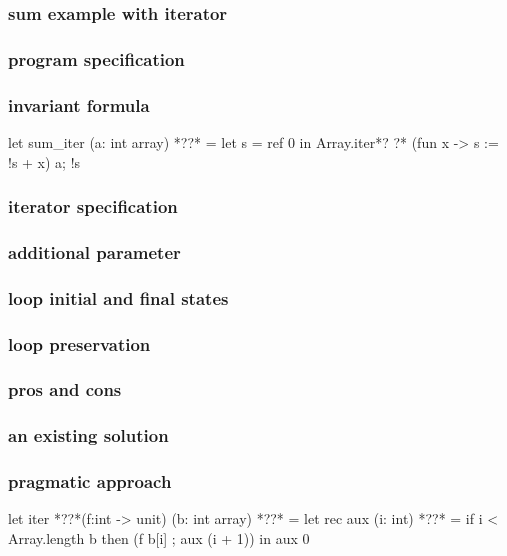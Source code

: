 \begin{frame}[fragile]
\frametitle<1>{sum example with {iterator}}
\frametitle<2>{program specification}
\frametitle<3>{invariant formula}
\begin{whycode}
 let sum_iter (a: int array) *??* 
 = let s = ref 0 in
   Array.iter*?
   ?* 
       (fun x ->  s := !s + x) a; 
     !s 
\end{whycode}
\end{frame}

\begin{frame}[fragile]
\frametitle<1>{iterator specification}
\frametitle<2>{additional parameter}
\frametitle<3>{loop initial and final states}
\frametitle<4>{loop preservation}
\frametitle<5-6>{pros and cons}
\frametitle<7>{an existing solution}
\frametitle<8>{pragmatic approach}
\begin{whycode}  
let iter *??*(f:int -> unit) (b: int array) *??* 
= let rec aux (i: int) *??*  
  = if i < Array.length b 
    then (f b[i] ; aux (i + 1)) 
  in aux 0
\end{whycode} 
\bigskip
{}
\end{frame}



